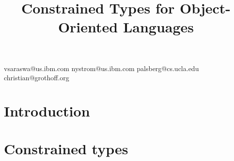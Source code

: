 \documentclass[10pt]{sigplanconf}
\newif\iflncs
\newif\iflstworks
\begin{document}
\iflncs
\title{Constrained Types for Object-Oriented Languages}
\titlerunning{Constrained Types}

\author{Vijay Saraswat\inst{1} \and Nathaniel Nystrom\inst{1}
\and Jens Palsberg\inst{2} \and Christian Grothoff\inst{3}}
\authorrunning{Vijay Saraswat et al.}

\institute{IBM T.~J. Watson Research~Center, P.O.~Box~704, Yorktown~Heights NY 10598 USA,
\email{\{vsaraswa,nystrom\}@us.ibm.com}
\and
UCLA~Computer~Science~Department,
Boelter~Hall, Los~Angeles CA 90095 USA,
\email{palsberg@cs.ucla.edu}
\and
Department~of~Computer~Science, University~of~Denver,
2360~S.~Gaylord~Street, John~Green~Hall, Room~214, Denver~CO, 80208 USA,
\email{christian@grothoff.org}}

\else

\title{Constrained Types for Object-Oriented Languages}
  {vsaraswa@us.ibm.com}
  {nystrom@us.ibm.com}
  {palsberg@cs.ucla.edu}
  {christian@grothoff.org}


\fi

\maketitle

\begin{abstract}

\end{abstract}

\iflstworks
\section{Introduction}\label{sec:intro}


\section{Constrained types}\label{sec:lang}
\end{document}
